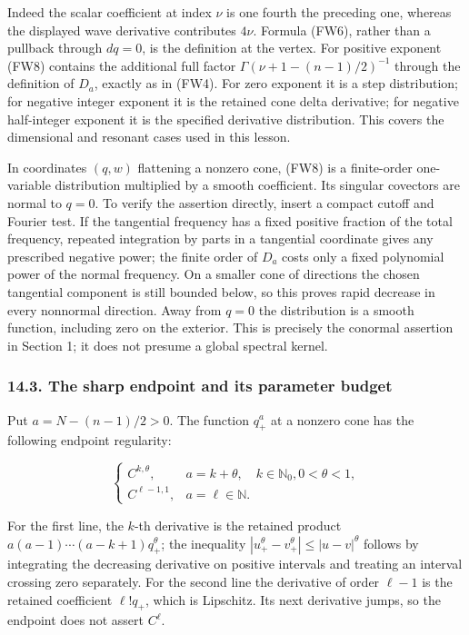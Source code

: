 \documentclass[
  11pt,
]{article}
\begin{document}
Indeed the scalar coefficient at index \(\nu\) is one fourth the
preceding one, whereas the displayed wave derivative contributes
\(4\nu\). Formula (FW6), rather than a pullback through \(dq=0\), is the
definition at the vertex. For positive exponent (FW8) contains the
additional full factor \(\Gamma(\nu+1-(n-1)/2)^{-1}\) through the
definition of \(D_a\), exactly as in (FW4). For zero exponent it is a
step distribution; for negative integer exponent it is the retained cone
delta derivative; for negative half-integer exponent it is the specified
derivative distribution. This covers the dimensional and resonant cases
used in this lesson.

In coordinates \((q,w)\) flattening a nonzero cone, (FW8) is a
finite-order one-variable distribution multiplied by a smooth
coefficient. Its singular covectors are normal to \(q=0\). To verify the
assertion directly, insert a compact cutoff and Fourier test. If the
tangential frequency has a fixed positive fraction of the total
frequency, repeated integration by parts in a tangential coordinate
gives any prescribed negative power; the finite order of \(D_a\) costs
only a fixed polynomial power of the normal frequency. On a smaller cone
of directions the chosen tangential component is still bounded below, so
this proves rapid decrease in every nonnormal direction. Away from
\(q=0\) the distribution is a smooth function, including zero on the
exterior. This is precisely the conormal assertion in Section 1; it does
not presume a global spectral kernel.

\subsubsection{14.3. The sharp endpoint and its parameter
budget}\label{the-sharp-endpoint-and-its-parameter-budget}

Put \(a=N-(n-1)/2>0\). The function \(q_+^a\) at a nonzero cone has the
following endpoint regularity:

\[
 \begin{cases}
 C^{k,\theta},&a=k+\theta,\quad k\in\mathbb N_0, 0<\theta<1,\\
 C^{\ell-1,1},&a=\ell\in\mathbb N.
 \end{cases}\tag{FW9}
\]

For the first line, the \(k\)-th derivative is the retained product
\(a(a-1)\cdots(a-k+1)q_+^\theta\); the inequality
\(|u_+^\theta-v_+^\theta|\leq|u-v|^\theta\) follows by integrating the
decreasing derivative on positive intervals and treating an interval
crossing zero separately. For the second line the derivative of order
\(\ell-1\) is the retained coefficient \(\ell!q_+\), which is Lipschitz.
Its next derivative jumps, so the endpoint does not assert \(C^\ell\).
\end{document}
